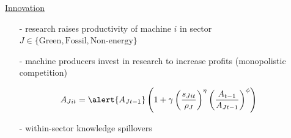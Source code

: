 \documentclass[11pt,aspectratio=169]{beamer}
\begin{document}
		\addtocounter{framenumber}{-1}
\begin{frame}{\hyperlink{modma}{Innovation}}
	\vspace{-2mm}
	\begin{itemize}
		\item[-] research raises productivity of machine $i$ in sector $J\in\{\text{Green},\text{Fossil},\text{Non-energy}\}$ \vspace{-1mm}
		\item[-] machine producers invest in research to increase profits \small{(monopolistic competition)}
		\vspace{-1mm}
		\normalsize
	\end{itemize}
	\vspace{-1.4mm}
	\large
	\begin{align*}
		A_{Jit}=\alert{A_{Jt-1}}\left(1+\gamma\left(\frac{s_{Jit}}{\rho_J}\right)^\eta\left(\frac{A_{t-1}}{A_{Jt-1}}\right)^\phi\right)
	\end{align*}
	\normalsize
	\vspace{-1.9mm}
	\begin{enumerate}
		\item[-] \alert{within-sector knowledge spillovers} \vspace{-1mm} %
		\item[] \  %
		\vspace{-1mm}
		\item[] \
	\end{enumerate}
	\small
\vspace{4mm}
\hspace{-2mm}
\begin{minipage}[t!]{0.46\textwidth}

\end{minipage}
\end{frame}
\end{document}
